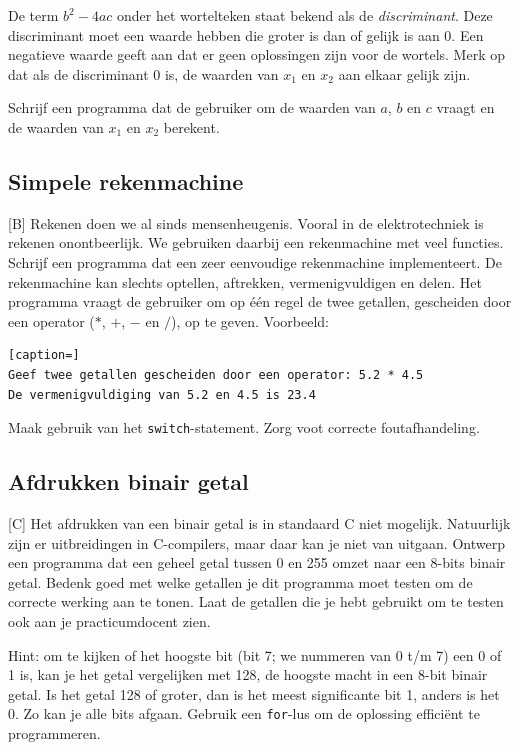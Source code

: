 \documentclass[a4paper,10pt,fleqn,twoside]{article}
\begin{document}
De term $b^2-4ac$ onder het wortelteken staat bekend als de \textsl{discriminant}. Deze discriminant moet een waarde hebben die groter is dan of gelijk is aan 0. Een negatieve waarde geeft aan dat er geen oplossingen zijn voor de wortels. Merk op dat als de discriminant 0 is, de waarden van $x_1$ en $x_2$ aan elkaar gelijk zijn.

Schrijf een programma dat de gebruiker om de waarden van $a$, $b$ en $c$ vraagt en de waarden van $x_1$ en $x_2$ berekent.

\subsection{Simpele rekenmachine}[B]
Rekenen doen we al sinds mensenheugenis. Vooral in de elektrotechniek is rekenen onontbeerlijk. We gebruiken daarbij een rekenmachine met veel functies. Schrijf een programma dat een zeer eenvoudige rekenmachine implementeert. De rekenmachine kan slechts optellen, aftrekken, vermenigvuldigen en delen. Het programma vraagt de gebruiker om op één regel de twee getallen, gescheiden door een operator ($*$, $+$, $-$ en $/$), op te geven. Voorbeeld:

\begin{lstlisting}[caption=]
Geef twee getallen gescheiden door een operator: 5.2 * 4.5
De vermenigvuldiging van 5.2 en 4.5 is 23.4
\end{lstlisting}

Maak gebruik van het \lstinline|switch|-statement. Zorg voot correcte foutafhandeling.

\subsection{Afdrukken binair getal}[C]
Het afdrukken van een binair getal is in standaard C niet mogelijk. Natuurlijk zijn er uitbreidingen in C-compilers, maar daar kan je niet van uitgaan. Ontwerp een programma dat een geheel getal tussen 0 en 255 omzet naar een 8-bits binair getal. Bedenk goed met welke getallen je dit programma moet testen om de correcte werking aan te tonen. Laat de getallen die je hebt gebruikt om te testen ook aan je practicumdocent zien.

Hint: om te kijken of het hoogste bit (bit 7; we nummeren van 0 t/m 7) een 0 of 1 is, kan je het getal vergelijken met 128, de hoogste macht in een 8-bit binair getal. Is het getal 128 of groter, dan is het meest significante bit 1, anders is het 0. Zo kan je alle bits afgaan. Gebruik een \lstinline|for|-lus om de oplossing efficiënt te programmeren.
\end{document}
